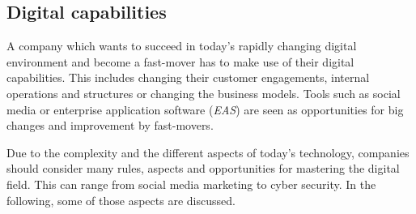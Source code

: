 \documentclass[a4]{scrartcl}
\begin{document}
	

	
	
	
	
	
	
	\subsection{Digital capabilities} \label{subsec:digitalcapabilities}
	
	A company which wants to succeed in today's rapidly changing digital environment and become a fast-mover %
	has to make use of their digital capabilities. This includes changing their customer engagements, internal operations and structures or changing the business models. Tools such as social media or enterprise application software (\textit{EAS}) are seen as opportunities for big changes and improvement by fast-movers.~\cite{leadingdigital}
	
	Due to the complexity and the different aspects of today's technology, companies should consider many rules, aspects and opportunities for mastering the digital field. This can range from social media marketing to cyber security. In the following, some of those aspects are discussed.
	
\end{document}

